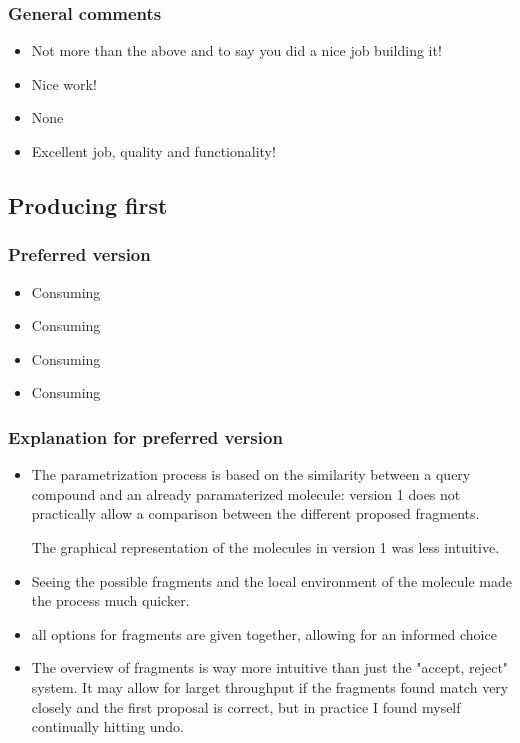 \subsubsection{General comments}
\begin{itemize}
\item Not more than the above and to say you did a nice job building it!

\item Nice work!

\item None

\item Excellent job, quality and functionality!

\end{itemize}


\subsection{Producing first}
\subsubsection{Preferred version}
\begin{itemize}
\item Consuming

\item Consuming

\item Consuming

\item Consuming

\end{itemize}


\subsubsection{Explanation for preferred version}
\begin{itemize}
\item The parametrization process is based on the similarity between a query compound and an already paramaterized molecule: version 1 does not practically allow a comparison between the different proposed fragments.

The graphical representation of the molecules in version 1 was less intuitive.

\item Seeing the possible fragments and the local environment of the molecule made the process much quicker. 

\item all options for fragments are given together, allowing for an informed choice

\item The overview of fragments is way more intuitive than just the "accept, reject" system. It may allow for larget throughput if the fragments found match very closely and the first proposal is correct, but in practice I found myself continually hitting undo.

\end{itemize}


